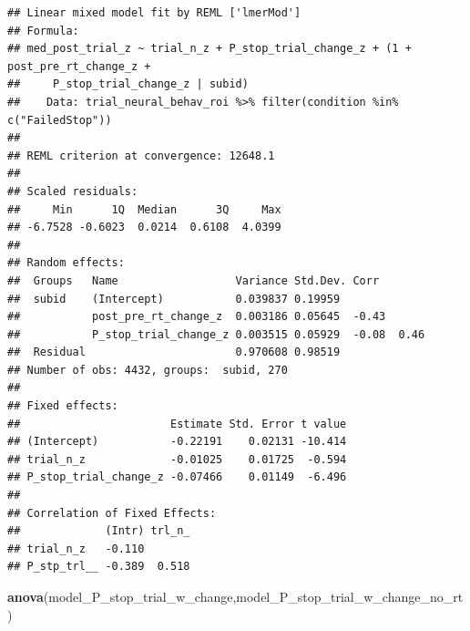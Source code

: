 \documentclass[
]{article}
\newenvironment{Shaded}{\begin{snugshade}}{\end{snugshade}}
\newcommand{\CommentTok}[1]{\textcolor[rgb]{0.56,0.35,0.01}{\textit{#1}}}
\newcommand{\DecValTok}[1]{\textcolor[rgb]{0.00,0.00,0.81}{#1}}
\newcommand{\KeywordTok}[1]{\textcolor[rgb]{0.13,0.29,0.53}{\textbf{#1}}}
\newcommand{\NormalTok}[1]{#1}
\newcommand{\OperatorTok}[1]{\textcolor[rgb]{0.81,0.36,0.00}{\textbf{#1}}}
\newcommand{\StringTok}[1]{\textcolor[rgb]{0.31,0.60,0.02}{#1}}
\begin{document}
\begin{Shaded}
\end{Shaded}

\begin{verbatim}
## Linear mixed model fit by REML ['lmerMod']
## Formula: 
## med_post_trial_z ~ trial_n_z + P_stop_trial_change_z + (1 + post_pre_rt_change_z +  
##     P_stop_trial_change_z | subid)
##    Data: trial_neural_behav_roi %>% filter(condition %in% c("FailedStop"))
## 
## REML criterion at convergence: 12648.1
## 
## Scaled residuals: 
##     Min      1Q  Median      3Q     Max 
## -6.7528 -0.6023  0.0214  0.6108  4.0399 
## 
## Random effects:
##  Groups   Name                  Variance Std.Dev. Corr       
##  subid    (Intercept)           0.039837 0.19959             
##           post_pre_rt_change_z  0.003186 0.05645  -0.43      
##           P_stop_trial_change_z 0.003515 0.05929  -0.08  0.46
##  Residual                       0.970608 0.98519             
## Number of obs: 4432, groups:  subid, 270
## 
## Fixed effects:
##                       Estimate Std. Error t value
## (Intercept)           -0.22191    0.02131 -10.414
## trial_n_z             -0.01025    0.01725  -0.594
## P_stop_trial_change_z -0.07466    0.01149  -6.496
## 
## Correlation of Fixed Effects:
##             (Intr) trl_n_
## trial_n_z   -0.110       
## P_stp_trl__ -0.389  0.518
\end{verbatim}

\begin{Shaded}
\begin{Highlighting}[]
\KeywordTok{anova}\NormalTok{(model_P_stop_trial_w_change,model_P_stop_trial_w_change_no_rt)}
\end{Highlighting}
\end{Shaded}
\end{document}
